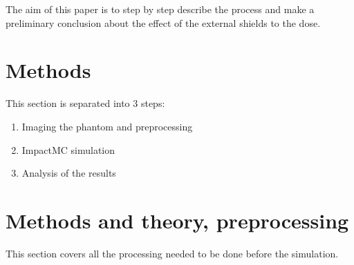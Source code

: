 \documentclass[fleqn,10pt]{SelfArx} %
\begin{document}
The aim of this paper is to step by step describe the process and make a preliminary conclusion about the effect of the external shields to the dose.


%



\section*{Methods}



This section is separated into 3 steps:
\begin{enumerate}[noitemsep] %
\item Imaging the phantom and preprocessing
\item ImpactMC simulation
\item Analysis of the results
\end{enumerate}


\section{Methods and theory, preprocessing}
This section covers all the processing needed to be done before the simulation.
\end{document}
